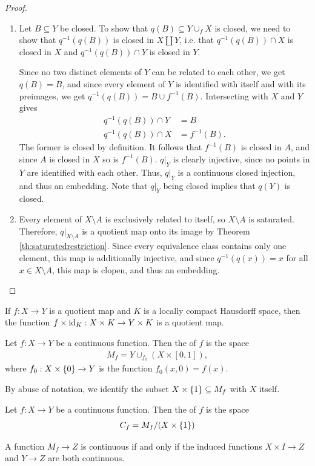 \begin{proof}
	\begin{enumerate}
		\item Let $B \subseteq Y$ be closed. To show that $q(B) \subseteq Y \cup_f X$ is closed, we need to show that $q^{-1}(q(B))$ is closed in $X \amalg Y$, i.e. that $q^{-1}(q(B)) \cap X$ is closed in $X$ and $q^{-1}(q(B)) \cap Y$ is closed in $Y$.
		
		Since no two distinct elements of $Y$ can be related to each other, we get $q(B) = B$, and since every element of $Y$ is identified with itself and with its preimages, we get $q^{-1}(q(B)) = B \cup f^{-1}(B)$. Intersecting with $X$ and $Y$ gives
		\begin{align*}
			q^{-1}(q(B)) \cap Y &= B\\
			q^{-1}(q(B)) \cap X &= f^{-1}(B).
		\end{align*}
		The former is closed by definition. It follows that $f^{-1}(B)$ is closed in $A$, and since $A$ is closed in $X$ so is $f^{-1}(B)$. $q|_Y$ is clearly injective, since no points in $Y$ are identified with each other. Thus, $q|_Y$ is a continuous closed injection, and thus an embedding. Note that $q|_Y$ being closed implies that $q(Y)$ is closed.
		\item Every element of $X \setminus A$ is exclusively related to itself, so $X \setminus A$ is saturated. Therefore, $q|_{X \setminus A}$ is a quotient map onto its image by Theorem \ref{th:saturatedrestriction}. Since every equivalence class contains only one element, this map is additionally injective, and since $q^{-1}(q(x)) = x$ for all $x \in X \setminus A$, this map is clopen, and thus an embedding.
	\end{enumerate}
\end{proof}
\begin{theorem}
	If $f : X \to Y$ is a quotient map and $K$ is a locally compact Hausdorff space, then the function $f \times \operatorname{id}_K : X \times K \to Y \times K$ is a quotient map.
\end{theorem}
\begin{definition} \label{df:mappingcylinder}
	Let $f : X \to Y$ be a continuous function. Then the  of $f$ is the space
	\begin{align*}
		M_f = Y \cup_{f_0} (X \times [0,1]),
	\end{align*}
	where $f_0 : X \times \qty{0} \to Y$ is the function $f_0(x, 0) = f(x)$.
\end{definition}
By abuse of notation, we identify the subset $X \times \qty{1} \subseteq M_f$ with $X$ itself.
\begin{definition}
	Let $f : X \to Y$ be a continuous function. Then the  of $f$ is the space
	\begin{align*}
		C_f = M_f / (X \times \qty{1})
	\end{align*}
\end{definition}
\begin{theorem}
	A function $M_f \to Z$ is continuous if and only if the induced functions $X \times I \to Z$ and $Y \to Z$ are both continuous.
\end{theorem}
